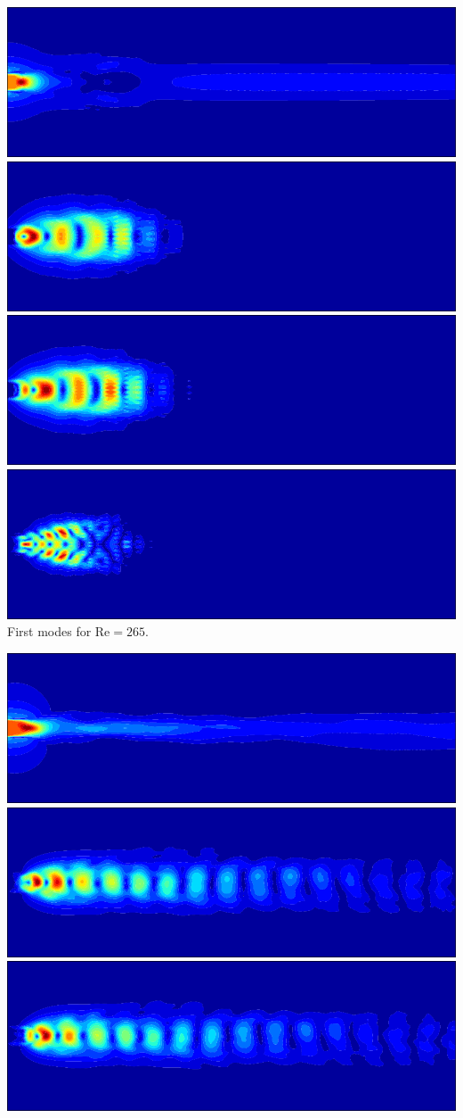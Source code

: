 \documentclass[a0,portrait]{a0poster}
\begin{document}
\begin{multicols}{2}
\vspace{0.5cm}

\begin{center}
  \includegraphics[width=0.48\linewidth]{figs/Re265-01} \hspace{0.1cm}
  \includegraphics[width=0.48\linewidth]{figs/Re265-02} \\[0.3cm]
  \includegraphics[width=0.48\linewidth]{figs/Re265-03} \hspace{0.1cm}
  \includegraphics[width=0.48\linewidth]{figs/Re265-04}
  First modes for $\text{Re} = 265$.
\end{center}
\begin{center}
  \includegraphics[width=0.48\linewidth]{figs/Re2580-01} \hspace{0.1cm}
  \includegraphics[width=0.48\linewidth]{figs/Re2580-02} \\[0.3cm]
  \includegraphics[width=0.48\linewidth]{figs/Re2580-03} \hspace{0.1cm}

\end{center}
\end{multicols}
\end{document}
